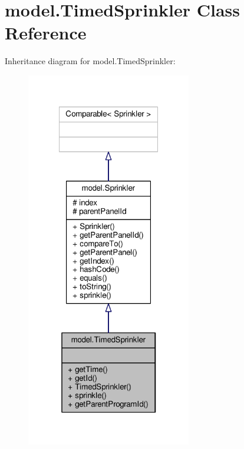 \hypertarget{classmodel_1_1TimedSprinkler}{\section{model.\-Timed\-Sprinkler Class Reference}
\label{classmodel_1_1TimedSprinkler}
}


Inheritance diagram for model.\-Timed\-Sprinkler\-:\nopagebreak
\begin{figure}[H]
\begin{center}
\leavevmode
\includegraphics[width=204pt]{classmodel_1_1TimedSprinkler__inherit__graph}
\end{center}
\end{figure}


